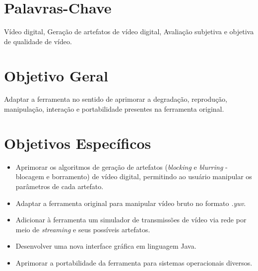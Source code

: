 \section{Palavras-Chave}
Vídeo digital, Geração de artefatos de vídeo digital, Avaliação subjetiva e objetiva de qualidade de vídeo.
\section{Objetivo Geral}
Adaptar a ferramenta  no sentido de aprimorar a degradação, reprodução, manipulação, interação e portabilidade  presentes na ferramenta original.
\section{Objetivos Específicos}
\begin{itemize}
	\item \textbf{} Aprimorar os algoritmos de geração de artefatos (\emph{blocking} e \emph{blurring} - blocagem e borramento) de vídeo digital, permitindo ao usuário manipular os parâmetros de cada artefato.
	\item \textbf{} Adaptar a ferramenta original para manipular vídeo bruto no formato \emph{.yuv}.
	\item \textbf{} Adicionar à ferramenta um simulador de transmissões de vídeo via rede por meio de \emph{streaming} e seus possíveis artefatos.
	\item \textbf{} Desenvolver uma nova interface gráfica em linguagem Java.
	\item \textbf{} Aprimorar a portabilidade da ferramenta para sistemas operacionais diversos.
\end{itemize}
